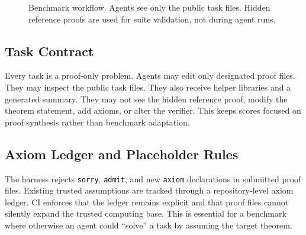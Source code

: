 \documentclass[conference]{IEEEtran}
\newcommand{\lean}{Lean 4}
\begin{document}
\begin{figure}[t]
\centering
{}
\caption{Benchmark workflow. Agents see only the public task files. Hidden reference proofs are used for suite validation, not during agent runs.}
\label{fig:workflow}
\end{figure}

\subsection{Task Contract}

Every task is a proof-only problem. Agents may edit only designated proof files.
They may inspect the public task files. They also receive helper libraries and
a generated summary.
They may not see the hidden reference proof, modify the theorem statement, add
axioms, or alter the verifier. This keeps scores focused on proof synthesis
rather than benchmark adaptation.

\subsection{Axiom Ledger and Placeholder Rules}

The harness rejects \texttt{sorry}, \texttt{admit}, and new \texttt{axiom}
declarations in submitted proof files. Existing trusted assumptions are tracked
through a repository-level axiom ledger. CI enforces that the ledger remains
explicit and that proof files cannot silently expand the trusted computing base.
This is essential for a benchmark where otherwise an agent could ``solve'' a
task by assuming the target theorem.
\end{document}
